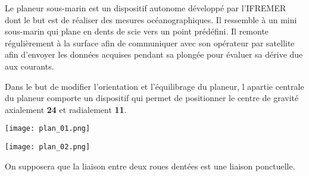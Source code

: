 \begin{multicols}{2}
Le planeur sous-marin est un dispositif autonome développé par l'IFREMER dont le but est de réaliser des mesures océanographiques. Il ressemble à un mini sous-marin qui plane en dents de scie vers un point prédéfini. Il remonte régulièrement à la surface afin de communiquer avec son opérateur par satellite afin d'envoyer les données acquises pendant sa plongée pour évaluer sa dérive due aux courants. 


Dans le but de modifier l'orientation et l'équilibrage du planeur, l apartie centrale du planeur comporte un dispositif qui permet de positionner le centre de gravité axialement \textbf{24} et radialement \textbf{11}. 

\begin{center}
\texttt{[image: plan\_01.png]}
\end{center}

\begin{center}
\texttt{[image: plan\_02.png]}
\end{center}


\ifprof
\begin{corrige}
\end{corrige}\else\fi

On supposera que la liaison entre deux roues dentées est une liaison ponctuelle. 


\ifprof
\begin{corrige}
\end{corrige}\else\fi


\end{multicols}